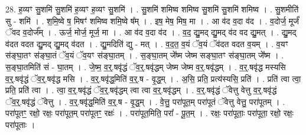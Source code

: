 \documentclass[17pt]{extarticle}
\begin{document}
28. ह॒व्यꣳ सु॒शमि॑ सु॒शमि॑ ह॒व्यꣳ ह॒व्यꣳ सु॒शमि॑ । . सु॒शमि॑ शमिष्व शमिष्व सु॒शमि॑ सु॒शमि॑ शमिष्व । . सु॒शमीति॑ सु - शमि॑ । . श॒मि॒ष्वे ष॒ मिषꣳ॑ शमिष्व शमि॒ष्वे ष᳚म् । . इष॒ मेष॒ मिष॒ मा । . आ व॑द व॒दा व॑द । . व॒दोर्ज॒ मूर्जं॑ ॅवद व॒दोर्ज᳚म् । . ऊर्ज॒ मोर्ज॒ मूर्ज॒ मा । . आ व॑द व॒दा व॑द । . व॒द॒ द्यु॒मद् द्यु॒मद् व॑द वद द्यु॒मत् । . द्यु॒मद् व॑दत वदत द्यु॒मद् द्यु॒मद् व॑दत । . द्यु॒मदिति॑ द्यु - मत् । . व॒द॒त॒ व॒यं ॅव॒यं ॅव॑दत वदत व॒यम् । . व॒यꣳ स॑ङ्घा॒तꣳ स॑ङ्घा॒तं ॅव॒यं ॅव॒यꣳ स॑ङ्घा॒तम् । . स॒ङ्घा॒तम् जे᳚ष्म जेष्म सङ्घा॒तꣳ स॑ङ्घा॒तम् जे᳚ष्म । . स॒ङ्घा॒तमिति॑ सं - घा॒तम् । . जे॒ष्म॒ व॒र्॒.षवृ॑द्धं ॅव॒र्॒.षवृ॑द्धम् जेष्म जेष्म व॒र्॒.षवृ॑द्धम् । . व॒र्॒.षवृ॑द्ध मस्यसि व॒र्॒.षवृ॑द्धं ॅव॒र्॒.षवृ॑द्ध मसि । . व॒र्॒.षवृ॑द्ध॒मिति॑ व॒र्॒.ष - वृ॒द्ध॒म् । . अ॒सि॒ प्रति॒ प्रत्य॑स्यसि॒ प्रति॑ । . प्रति॑ त्वा त्वा॒ प्रति॒ प्रति॑ त्वा । . त्वा॒ व॒र्॒.षवृ॑द्धं ॅव॒र्॒.षवृ॑द्धम् त्वा त्वा व॒र्॒.षवृ॑द्धम् । . व॒र्॒.षवृ॑द्धं ॅवेत्तु वेत्तु व॒र्॒.षवृ॑द्धं ॅव॒र्॒.षवृ॑द्धं ॅवेत्तु । . व॒र्॒.षवृ॑द्ध॒मिति॑ व॒र्॒.ष - वृ॒द्ध॒म् । . वे॒त्तु॒ परा॑पूत॒म् परा॑पूतं ॅवेत्तु वेत्तु॒ परा॑पूतम् । . परा॑पूतꣳ॒॒ रक्षो॒ रक्षः॒ परा॑पूत॒म् परा॑पूतꣳ॒॒ रक्षः॑ । . परा॑पूत॒मिति॒ परा᳚ - पू॒त॒म् । . रक्षः॒ परा॑पूताः॒ परा॑पूता॒ रक्षो॒ रक्षः॒ परा॑पूताः । \newline
\end{document}
